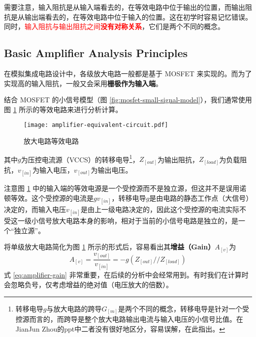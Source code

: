 需要注意，输入阻抗是从输入端看去的，在等效电路中位于输出的位置，而输出阻抗是从输出端看去的，在等效电路中位于输入的位置。这在初学时容易记忆错误。
同时，\textcolor{red}{输入阻抗与输出阻抗之间\textbf{没有对称关系}}，它们是两个不同的概念。

\subsection{Basic Amplifier Analysis Principles}
在模拟集成电路设计中，各级放大电路一般都是基于 MOSFET 来实现的。而为了实现高的输入阻抗，一般又会采用\textbf{栅极作为输入端}。

结合 MOSFET 的小信号模型（图 \ref{fig:mosfet-small-signal-model}），我们通常使用图 \ref{fig:amplifier-equivalent-circuit} 所示的等效电路来进行分析计算。
\begin{figure}[h!tb]
    \centering
    \texttt{[image: amplifier-equivalent-circuit.pdf]}
    \caption{放大电路等效电路}
    \label{fig:amplifier-equivalent-circuit}
\end{figure}
其中$g$为压控电流源（VCCS）的转移电导\footnote{转移电导$g$与放大电路的跨导$G_[m]$是两个不同的概念，转移电导是针对一个受控源而言的，而跨导是整个放大电路输出电流与输入电压的小信号比值。在JianJun Zhou的ppt中二者没有很好地区分，容易误解，在此指出。}，$Z_[out]$为输出阻抗，$Z_[load]$为负载阻抗，$v_[in]$为输入电压，$v_[out]$为输出电压。

注意图 \ref{fig:amplifier-equivalent-circuit} 中的输入端的等效电源是一个受控源而不是独立源，但这并不是误用诺顿等效。这个受控源的电流是$g v_[in]$，转移电导$g$是由电路的静态工作点（大信号）决定的，而输入电压$v_[in]$是由上一级电路决定的，因此这个受控源的电流实际不受这一级小信号放大电路本身的影响，相对于当前的小信号电路是独立的，是一个“独立源”。

将单级放大电路简化为图 \ref{fig:amplifier-equivalent-circuit} 所示的形式后，容易看出其\textbf{增益（Gain）$A_[v]$}为
\begin{equation}
    A_[v] = \frac{v_[out]}{v_[in]} = -g (Z_[out] // Z_[load])
    \label{eq:amplifier-gain}
\end{equation}
式 \ref{eq:amplifier-gain} 非常重要，在后续的分析中会经常用到。有时我们在计算时会忽略负号，仅考虑增益的绝对值（电压放大的倍数）。

